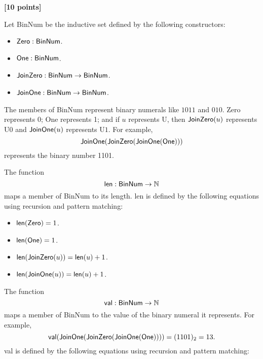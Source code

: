 \documentclass[11pt,fleqn]{article}
\newcommand{\bi}{\begin{itemize}}
\newcommand{\ei}{\end{itemize}}
\newcommand{\mname}[1]{\mbox{\sf #1}}
\begin{document}
  \bigskip

  \item \textbf{[10 points]} 

  Let \mname{BinNum} be the inductive set defined by the following
  constructors:

  \bi

    \item[] $\mname{Zero} : \mname{BinNum}$.

    \item[] $\mname{One} : \mname{BinNum}$.

    \item[] $\mname{JoinZero} : \mname{BinNum} \rightarrow \mname{BinNum}$.

    \item[] $\mname{JoinOne} : \mname{BinNum} \rightarrow \mname{BinNum}$.

  \ei

  The members of \mname{BinNum} represent binary numerals like $1011$
  and $010$. \mname{Zero} represents 0; \mname{One} represents 1; and
  if $u$ represents U, then $\mname{JoinZero}(u)$ represents U$0$
  and $\mname{JoinOne}(u)$ represents U$1$.  For
  example, \[\mname{JoinOne}(\mname{JoinZero}(\mname{JoinOne}(\mname{One})))\]
  represents the binary number 1101.

  The function \[\mname{len} : \mname{BinNum} \rightarrow \mathbb{N}\]
  maps a member of \mname{BinNum} to its length.  \mname{len} is
  defined by the following equations using recursion and pattern
  matching:

  \bi

    \item[] $\mname{len}(\mname{Zero}) = 1$.

    \item[] $\mname{len}(\mname{One}) = 1$.

    \item[] $\mname{len}(\mname{JoinZero}(u)) = \mname{len}(u) + 1$.

    \item[] $\mname{len}(\mname{JoinOne}(u)) = \mname{len}(u) + 1$.

  \ei

  The function \[\mname{val} : \mname{BinNum} \rightarrow \mathbb{N}\]
  maps a member of \mname{BinNum} to the value of the binary numeral
  it represents.  For
  example, \[\mname{val}(\mname{JoinOne}(\mname{JoinZero}(\mname{JoinOne}(\mname{One}))))
  = (1101)_2 = 13.\] \mname{val} is defined by the following equations
  using recursion and pattern matching:
\end{document}
